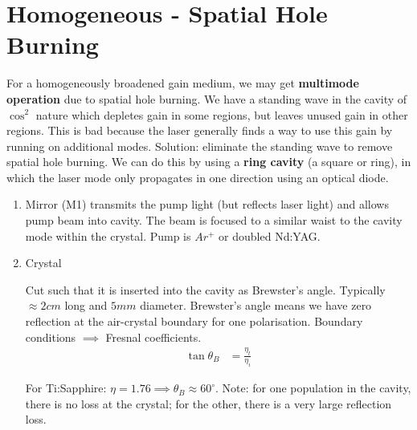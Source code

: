 \documentclass[a4paper, 11pt, normalem]{report}
\begin{document}
\section{Homogeneous - Spatial Hole Burning}
For a homogeneously broadened gain medium, we may get \textbf{multimode operation} due to spatial hole burning. 
We have a standing wave in the cavity of $\cos^2$ nature which depletes gain in some regions, but leaves unused gain in other regions. 
This is bad because the laser generally finds a way to use this gain by running on additional modes.
Solution: eliminate the standing wave to remove spatial hole burning. 
We can do this by using a \textbf{ring cavity} (a square or ring), in which the laser mode only propagates in one direction using an optical diode. 
\begin{enumerate}
    \item Mirror (M1) transmits the pump light (but reflects laser light) and allows pump beam into cavity. 
        The beam is focused to a similar waist to the cavity mode within the crystal. 
        Pump is $Ar^+$ or doubled Nd:YAG.
    \item Crystal 
        \begin{multicols}{2}
        \begin{figure}[H]
            \centering
        \end{figure}
        \columnbreak
        Cut such that it is inserted into the cavity as Brewster's angle.
        Typically $\approx2cm$ long and $5mm$ diameter. 
        Brewster's angle means we have zero reflection at the air-crystal boundary for one polarisation.
        Boundary conditions $\implies$ Fresnal coefficients. 
        \begin{align}
            \tan\theta_B &= \frac{\eta_t}{\eta_i}
        \end{align}
        \end{multicols}
        For Ti:Sapphire: $\eta=1.76\implies\theta_B\approx60^\circ$.
        Note: for one population in the cavity, there is no loss at the crystal; for the other, there is a very large reflection loss.

\end{enumerate}
\end{document}
